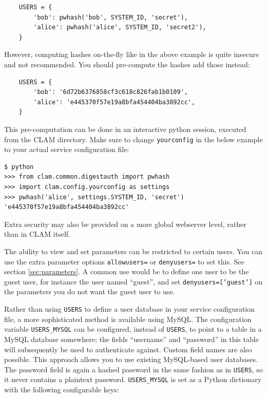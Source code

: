 \documentclass[a4paper,12pt]{report}
\begin{document}
\begin{verbatim}
    USERS = {
        'bob': pwhash('bob', SYSTEM_ID, 'secret'), 
		'alice': pwhash('alice', SYSTEM_ID, 'secret2'),
    }
\end{verbatim}

However, computing hashes on-the-fly like in the above example is quite
insecure and not recommended. You should pre-compute the hashes add those
instead:

\begin{verbatim}
    USERS = {
        'bob': '6d72b6376858cf3c618c826fab1b0109',
		'alice': 'e445370f57e19a8bfa454404ba3892cc',
    }
\end{verbatim}

This pre-computation can be done in an interactive python session, executed from
the CLAM directory. Make sure to change \texttt{yourconfig} in the below
example to your actual service configuration file:

\begin{verbatim}
$ python
>>> from clam.common.digestauth import pwhash
>>> import clam.config.yourconfig as settings
>>> pwhash('alice', settings.SYSTEM_ID, 'secret')
'e445370f57e19a8bfa454404ba3892cc'
\end{verbatim}


Extra security may also be provided on a more global webserver level, rather than in CLAM itself.

The ability to view and set parameters can be restricted to certain users. You
can use the extra parameter options \texttt{allowusers=} or \texttt{denyusers=}
to set this. See section \ref{sec:parameters}. A common use would be to define
one user to be the guest user, for instance the user named ``guest'', and set
\texttt{denyusers=['guest']} on the parameters you do not want the guest user
to use.

Rather than using \texttt{USERS} to define a user database in your service
configuration file, a more sophisticated method is available using MySQL. The
configuration variable \texttt{USERS\_MYSQL} can be configured, instead of
\texttt{USERS}, to point to a table in a MySQL database somewhere; the fields
``username'' and ``password'' in this table will subsequently be used to
authenticate against. Custom field names are also possible. This approach
allows you to use existing MySQL-based user databases. The password field is
again a hashed password in the same fashion as in \texttt{USERS}, so it never
contains a plaintext password. \texttt{USERS\_MYSQL} is set as a Python
dictionary with the following configurable keys:
\end{document}

